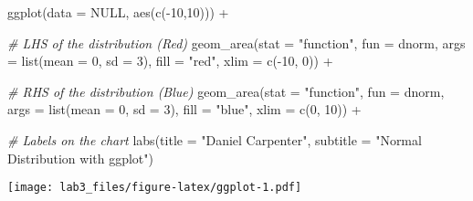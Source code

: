 \documentclass[
  12pt,
]{article}
\newenvironment{Shaded}{\begin{snugshade}}{\end{snugshade}}
\newcommand{\AttributeTok}[1]{\textcolor[rgb]{0.77,0.63,0.00}{#1}}
\newcommand{\CommentTok}[1]{\textcolor[rgb]{0.56,0.35,0.01}{\textit{#1}}}
\newcommand{\ConstantTok}[1]{\textcolor[rgb]{0.00,0.00,0.00}{#1}}
\newcommand{\DecValTok}[1]{\textcolor[rgb]{0.00,0.00,0.81}{#1}}
\newcommand{\FunctionTok}[1]{\textcolor[rgb]{0.00,0.00,0.00}{#1}}
\newcommand{\NormalTok}[1]{#1}
\newcommand{\SpecialCharTok}[1]{\textcolor[rgb]{0.00,0.00,0.00}{#1}}
\newcommand{\StringTok}[1]{\textcolor[rgb]{0.31,0.60,0.02}{#1}}
\begin{document}
\begin{Shaded}
\begin{Highlighting}[]
\FunctionTok{ggplot}\NormalTok{(}\AttributeTok{data =} \ConstantTok{NULL}\NormalTok{, }\FunctionTok{aes}\NormalTok{(}\FunctionTok{c}\NormalTok{(}\SpecialCharTok{{-}}\DecValTok{10}\NormalTok{,}\DecValTok{10}\NormalTok{))) }\SpecialCharTok{+}
  
  \CommentTok{\# LHS of the distribution (Red)}
  \FunctionTok{geom\_area}\NormalTok{(}\AttributeTok{stat =} \StringTok{"function"}\NormalTok{, }
            \AttributeTok{fun =}\NormalTok{ dnorm, }
            \AttributeTok{args =} \FunctionTok{list}\NormalTok{(}\AttributeTok{mean =} \DecValTok{0}\NormalTok{, }\AttributeTok{sd =} \DecValTok{3}\NormalTok{),}
            \AttributeTok{fill =} \StringTok{"red"}\NormalTok{, }\AttributeTok{xlim =} \FunctionTok{c}\NormalTok{(}\SpecialCharTok{{-}}\DecValTok{10}\NormalTok{, }\DecValTok{0}\NormalTok{))  }\SpecialCharTok{+} 
  
  \CommentTok{\# RHS of the distribution (Blue)}
  \FunctionTok{geom\_area}\NormalTok{(}\AttributeTok{stat =} \StringTok{"function"}\NormalTok{, }
            \AttributeTok{fun =}\NormalTok{ dnorm, }
            \AttributeTok{args =} \FunctionTok{list}\NormalTok{(}\AttributeTok{mean =} \DecValTok{0}\NormalTok{, }\AttributeTok{sd =} \DecValTok{3}\NormalTok{),}
            \AttributeTok{fill =} \StringTok{"blue"}\NormalTok{, }\AttributeTok{xlim =} \FunctionTok{c}\NormalTok{(}\DecValTok{0}\NormalTok{, }\DecValTok{10}\NormalTok{))  }\SpecialCharTok{+} 
  
  \CommentTok{\# Labels on the chart}
  \FunctionTok{labs}\NormalTok{(}\AttributeTok{title =} \StringTok{"Daniel Carpenter"}\NormalTok{,}
       \AttributeTok{subtitle =} \StringTok{"Normal Distribution with ggplot"}\NormalTok{)}
\end{Highlighting}
\end{Shaded}

\texttt{[image: lab3\_files/figure-latex/ggplot-1.pdf]}
\end{document}
